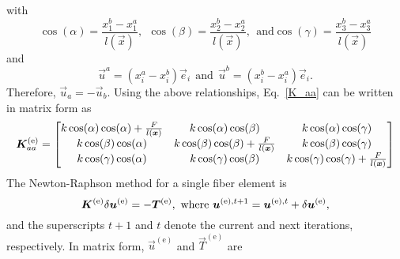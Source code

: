 %
with
%
\begin{equation}
\cos(\alpha) = \frac{x^b_1 - x^a_1}{l(\vec{x})}, \ \ \cos(\beta) = \frac{x^b_2 - x^a_2}{l(\vec{x})}, \ \ \text{and} \cos(\gamma) = \frac{x^b_3 - x^a_3}{l(\vec{x})} 
\end{equation}
%
and 
%
\begin{equation}
\vec{u}^a = (x^a_i - x^b_i) \vec{e}_i \ \ \text{and} \ \ \vec{u}^b = (x^b_i - x^a_i) \vec{e}_i .
\end{equation}
%
Therefore, $\vec{u}_a = -\vec{u}_b$. Using the above relationships, Eq.\ \eqref{K_aa} can be written in matrix form as
%
\begin{eqnarray}
\bm{K}^{(\text{e})}_{aa} =
\begin{bmatrix}
k \cos(\alpha)\cos(\alpha) + \frac{F}{l(\bm{x})} & k \cos(\alpha)\cos(\beta) & k \cos(\alpha)\cos(\gamma) \\
k \cos(\beta)\cos(\alpha) & k \cos(\beta)\cos(\beta)+ \frac{F}{l(\bm{x})}  & k \cos(\beta)\cos(\gamma) \\
k \cos(\gamma)\cos(\alpha) & k \cos(\gamma)\cos(\beta) & k \cos(\gamma)\cos(\gamma) + \frac{F}{l(\bm{x})} 
\end{bmatrix}
\label{K^e_aa_matrix}
\end{eqnarray}
%
The Newton-Raphson method for a single fiber element is
%
\begin{equation}
\mat{K}^{(\text{e})} \delta \vec{u}^{(\text{e})} = - \vec{T}^{(\text{e})}, \ \text{where} \ \vec{u}^{(\text{e}),t+1}  = \vec{u}^{(\text{e}),t} + \delta \vec{u}^{(\text{e})},
\label{Newton_Raphson}
\end{equation}
%
and the superscripts $t+1$ and $t$ denote the current and next iterations, respectively. In matrix form, $\vec{u}^{(\text{e})}$ and $\vec{T}^{(\text{e})}$ are
%
